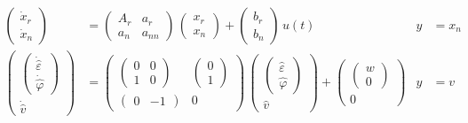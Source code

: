 \begin{align*}
    \begin{pmatrix}
        \dot x_r \\ \dot x_n 
    \end{pmatrix} &= \begin{pmatrix}
        A_r & a_r \\ a_n & a_{nn} 
    \end{pmatrix}\,\begin{pmatrix}
        x_r \\ x_n 
    \end{pmatrix} + \begin{pmatrix}
        b_r \\ b_n 
    \end{pmatrix}\,u(t) & y &= x_n \\
    \begin{pmatrix}
        \begin{pmatrix} \dot{\hat \varepsilon} \\ \dot{\hat \varphi} \end{pmatrix} \\ \dot{\hat v} 
    \end{pmatrix} &= \begin{pmatrix}
        \begin{pmatrix}
            0 & 0 \\ 1 & 0
        \end{pmatrix} & \begin{pmatrix}
            0 \\ 1
        \end{pmatrix} \\
        \begin{pmatrix}
            0 & -1
        \end{pmatrix} & 0
    \end{pmatrix}\,\begin{pmatrix}
        \begin{pmatrix} \hat \varepsilon \\ \hat \varphi \end{pmatrix} \\ \hat v
    \end{pmatrix} + \begin{pmatrix}
        \begin{pmatrix} w \\ 0 \end{pmatrix} \\ 0
    \end{pmatrix} & y &= v
\end{align*} 

